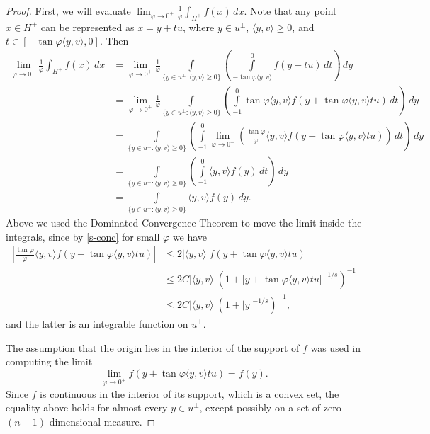 \documentclass[12pt,letterpaper,reqno]{amsart}
\theoremstyle{definition}
\begin{document}
\begin{proof}
						
						
						First, we will evaluate   $\lim_{\varphi \to 0^+}\frac{1}{\varphi}\int_{H^+} f(x) \, dx$.
							Note that any point $x \in H^+$ can be represented as $x = y + t u$, where $y \in u^\perp$, $ \langle y,v\rangle \ge 0$, and  $t \in [-\tan\varphi \langle y,v\rangle, 0]$.  Then
					\begin{align*}
					\lim_{\varphi\to 0^+} \frac1{\varphi}	\int_{H^+} f(x) \, dx & = \lim_{\varphi\to 0^+} \frac1{\varphi}\int\limits_{\{ y\in u^\perp:\langle y,v\rangle\ge 0\}} \left( \int\limits_{-\tan\varphi \langle y,v\rangle }^0 f(y + tu)\, dt \right) \,dy\\
					& = \lim_{\varphi\to 0^+} \frac1{\varphi}\int\limits_{\{ y\in u^\perp:\langle y,v\rangle\ge 0\}} \left(\int\limits_{-1 }^0 \tan\varphi \langle y,v\rangle f\left(y + \tan\varphi \langle y,v\rangle tu\right)\, dt \right)\, dy\\
					& = \int\limits_{\{ y\in u^\perp:\langle y,v\rangle\ge 0\}} \left( \int\limits_{-1 }^0 \lim_{\varphi\to 0^+}\left( \frac{\tan\varphi}{\varphi}  \langle y,v\rangle f\left(y + \tan\varphi \langle y,v\rangle tu\right)\right)\, dt \right)\, dy\\
					& = \int\limits_{\{ y\in u^\perp:\langle y,v\rangle\ge 0\}} \left(\int\limits_{-1 }^0   \langle y,v\rangle f\left(y \right) \, dt \right)\, dy\\
				& = \int\limits_{\{ y\in u^\perp:\langle y,v\rangle\ge 0\}}    \langle y,v\rangle f\left(y \right) \,   dy.
						\end{align*}						
							Above we used  the Dominated Convergence Theorem  to move the limit inside the integrals, since	by \eqref{s-conc} for small $\varphi$ 	we have					
				\begin{align*}
						\left| \frac{\tan\varphi}{\varphi}  \langle y,v\rangle f\left(y + \tan\varphi \langle y,v\rangle tu\right) \right| & \leq  2 |\langle y,v\rangle| f\left(y + \tan\varphi \langle y,v\rangle tu\right)\\
						& \leq  2 C |\langle y,v\rangle| {(1+|y + \tan\varphi \langle y,v\rangle tu|^{-1/s})^{-1}}\\
						& \le 2 C |\langle y,v\rangle| {(1+|y |^{-1/s})^{-1}},
					\end{align*}
						and the  latter is an integrable function on $u^\perp$.		
						
						
						The assumption that the origin lies in the interior of the support of 
						$f$  was used in computing the limit 	$$\lim_{\varphi\to 0^+}f\left(y + \tan\varphi \langle y,v\rangle tu\right)= f\left(y\right).$$ Since $f$ is continuous in the interior of its support, which is a convex set,   the equality above holds for almost every  $y\in u^\perp$, except possibly on a set of  zero $(n-1)$-dimensional measure.
						

\end{proof}
\end{document}
